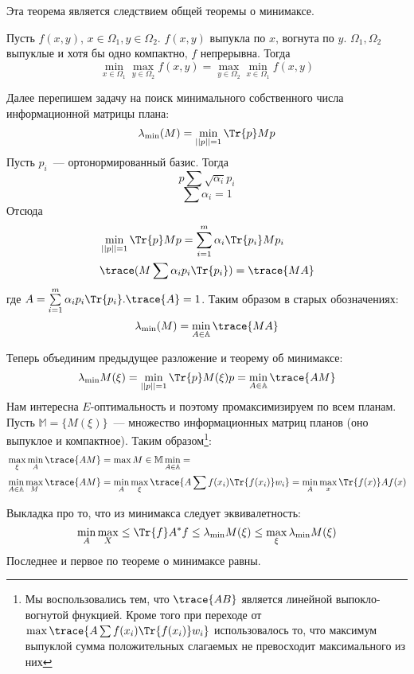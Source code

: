 Эта теорема является следствием общей теоремы о минимаксе.
\begin{thm}
Пусть $f(x,y)$, $x\in \Omega_1, y\in \Omega_2$. $f(x,y)$ выпукла по $x$, вогнута по $y$. $\Omega_1, \Omega_2$ выпуклые и хотя бы одно компактно, $f$ непрерывна. Тогда 
$$ \min\limits_{x \in \Omega_1} \max\limits_{y \in \Omega_2} f(x,y) = \max\limits_{y \in \Omega_2} \min\limits_{x \in \Omega_1} f(x,y)$$
\end{thm}

Далее перепишем задачу на поиск минимального собственного числа информационной матрицы плана:
 $$\lambda_{\min}(M) = \min \limits_{||p||=1} \Tr{p}Mp$$
  Пусть $p_i$ — ортонормированный базис. Тогда 
$$p \sum \sqrt{\alpha_i} p_i$$
$$ \sum \alpha_i = 1$$
Отсюда 
\begin{equation}
\begin{split}
&\min \limits_{||p||=1} \Tr{p}Mp = \sum \limits_{i=1}^m \alpha_i\Tr{p_i}Mp_i \\
&\trace (M \sum \alpha_i p_i \Tr{p_i}) = \trace{MA}
\end{split}
\end{equation}
где $A = \sum \limits_{i=1}^m \alpha_i p_i\Tr{p_i}. \trace{A} = 1$. Таким образом в старых обозначениях:
$$\lambda_{\min}(M) = \min \limits_{A \in \mathbb{A}} \trace{MA}$$

Теперь объединим предыдущее разложение и теорему об минимаксе:
$$\lambda_{\min}M(\xi) = \min_{||p||=1}\Tr{p}M(\xi)p = \min_{A \in \mathbb{A}} \trace{AM}$$
Нам интересна $E$-оптимальность и поэтому промаксимизируем по всем планам. Пусть $\mathbb{M} = \{ M(\xi) \}$ — множество информационных матриц планов (оно выпуклое и компактное). Таким образом\footnote{Мы воспользовались тем, что $\trace{AB}$ является линейной выпокло-вогнутой фнукцией. Кроме того при переходе от
$\max\trace{A\sum f(x_i)\Tr{f(x_i)}w_i}$ использовалось то, что максимум выпуклой сумма положительных слагаемых не превосходит максимального из них}:
\begin{equation}
\begin{split}
&\max\limits_{\xi}\min\limits_{A}\trace{AM} = \max{M \in \mathbb{M}}\min\limits_{A \in \mathbb{A}} = \\
&\min\limits_{A \in \mathbb{A}}\max\limits_M\trace{AM} = \min\limits_{A}\max\limits_{\xi}\trace{A\sum f(x_i)\Tr{f(x_i)}w_i} = \min\limits_{A}\max\limits_{x}\Tr{f(x)}Af(x)
\end{split}
\end{equation}

Выкладка про то, что из минимакса следует эквивалетность:
$$ \min\limits_{A} \max\limits_{X} \leq \Tr{f}A^{*} f \leq \lambda_{\min}M(\xi) \leq \max\limits_{\xi}\lambda_{\min}M(\xi)$$
Последнее и первое по теореме о минимаксе равны.


